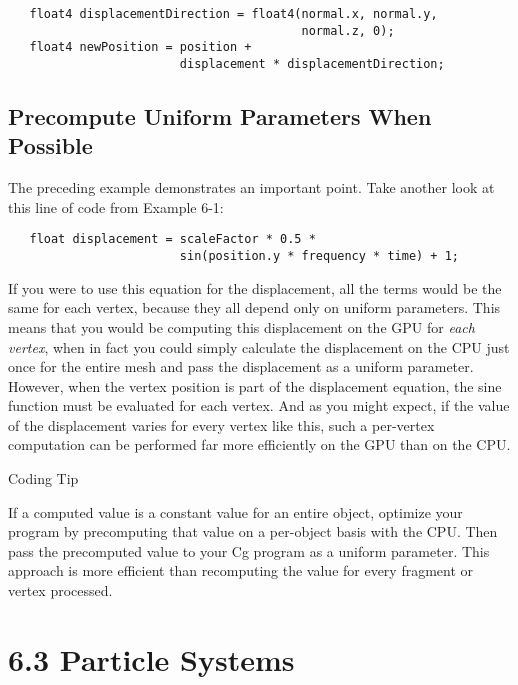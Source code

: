 \documentclass[../main.tex]{subfiles}
\begin{document}
\FloatBarrier
\begin{lstlisting}
   float4 displacementDirection = float4(normal.x, normal.y,
                                         normal.z, 0);
   float4 newPosition = position +
                        displacement * displacementDirection;
\end{lstlisting}
\FloatBarrier

\subsection*{Precompute Uniform Parameters When Possible}

The preceding example demonstrates an important point. Take another look at this line of code from Example 6-1:

\FloatBarrier
\begin{lstlisting}
   float displacement = scaleFactor * 0.5 *
                        sin(position.y * frequency * time) + 1;
\end{lstlisting}
\FloatBarrier

If you were to use this equation for the displacement, all the terms would be the same for each vertex, because they all depend only on uniform parameters. This means that you would be computing this displacement on the GPU for \textit{each vertex}, when in fact you could simply calculate the displacement on the CPU just once for the entire mesh and pass the displacement as a uniform parameter. However, when the vertex position is part of the displacement equation, the sine function must be evaluated for each vertex. And as you might expect, if the value of the displacement varies for every vertex like this, such a per-vertex computation can be performed far more efficiently on the GPU than on the CPU.

\begin{framed}
Coding Tip

If a computed value is a constant value for an entire object, optimize your program by precomputing that value on a per-object basis with the CPU. Then pass the precomputed value to your Cg program as a uniform parameter. This approach is more efficient than recomputing the value for every fragment or vertex processed.
\end{framed}

\section{6.3 Particle Systems}
\end{document}

